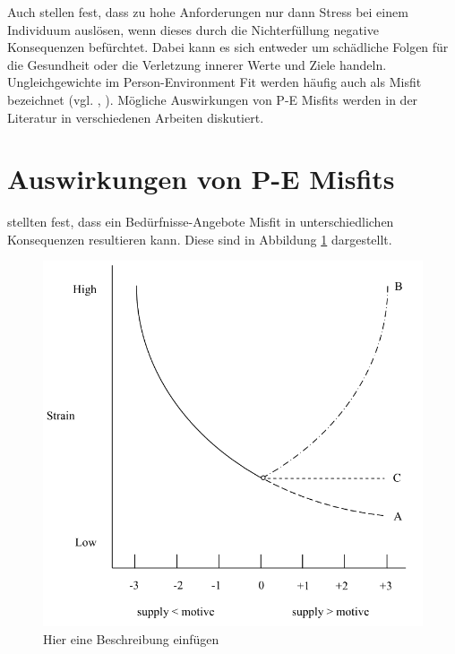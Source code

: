 Auch \textcite[S. 1ff.]{lazarus:1978} stellen fest, dass zu hohe Anforderungen nur dann Stress bei einem Individuum auslösen, wenn dieses durch die Nichterfüllung negative Konsequenzen befürchtet. Dabei kann es sich entweder um schädliche Folgen für die Gesundheit oder die Verletzung innerer Werte und Ziele handeln.\\
Ungleichgewichte im Person-Environment Fit werden häufig auch als Misfit bezeichnet (vgl. \cite[S. 2]{edwards:2004}, \cite[S. 4]{kristof:1996}). Mögliche Auswirkungen von P-E Misfits werden in der Literatur in verschiedenen Arbeiten diskutiert.

\section{Auswirkungen von P-E Misfits}
\label{ch:personEnvironmentFit:auswirkungenErhoehterAngebote}
\textcite{mechanismsOfJobStressAndStrain:1982} stellten fest, dass ein Bedürfnisse-Angebote Misfit in unterschiedlichen Konsequenzen resultieren kann. Diese sind in Abbildung \ref{fig:personEnvironmentFit:auswirkungenErhoehterAngebote:abb1} dargestellt.\\
\begin{figure}[h]
	\centering
	\includegraphics[width=1\textwidth]{gfx/ueberschuss_supply_motive.png}
	\caption{Hier eine Beschreibung einfügen \cite[S. 23]{edwards:2008}}
	\label{fig:personEnvironmentFit:auswirkungenErhoehterAngebote:abb1}
\end{figure}\\
